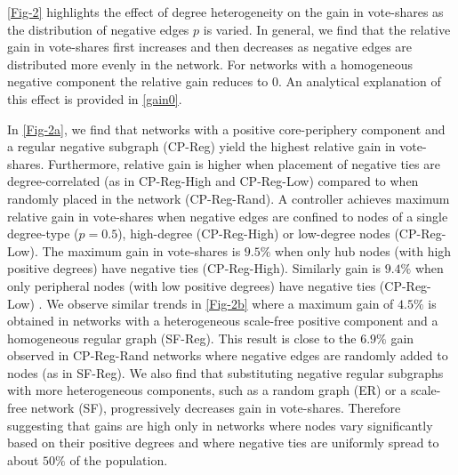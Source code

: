 \cref{Fig-2} highlights the effect of degree heterogeneity on the gain in vote-shares as the distribution of negative edges $p$ is varied.
In general, we find that the relative gain in vote-shares first increases and then decreases as negative edges are distributed more evenly in the network. For networks with a homogeneous negative component the relative gain reduces to $0$. An analytical explanation of this effect is provided in \cref{gain0}.    


In \cref{Fig-2a}, we find that networks with a positive core-periphery component and a regular negative subgraph (CP-Reg) yield the highest relative gain in vote-shares. Furthermore, relative gain is higher when placement of negative ties are degree-correlated (as in CP-Reg-High and CP-Reg-Low) compared to when randomly placed in the network (CP-Reg-Rand). 
A controller achieves maximum relative gain in vote-shares when negative edges are confined to nodes of a single degree-type ($p=0.5$), high-degree (CP-Reg-High) or low-degree nodes (CP-Reg-Low).
The maximum gain in vote-shares is $9.5\%$ when only hub nodes (with high positive degrees) have negative ties (CP-Reg-High). Similarly gain is $9.4\%$ when only peripheral nodes (with low positive degrees) have negative ties (CP-Reg-Low) . 
We observe similar trends in \cref{Fig-2b} where a maximum gain of $4.5\%$ is obtained in networks with a heterogeneous scale-free positive component and a homogeneous regular graph (SF-Reg). This result is close to the $6.9\%$ gain observed in CP-Reg-Rand networks where negative edges are randomly added to nodes (as in SF-Reg). We also find that substituting negative regular subgraphs with more heterogeneous components, such as a random graph (ER) or a scale-free network (SF), progressively decreases gain in vote-shares. Therefore suggesting that gains are high only in networks where nodes vary significantly based on their positive degrees and where negative ties are uniformly spread to about $50\%$ of the population. 








